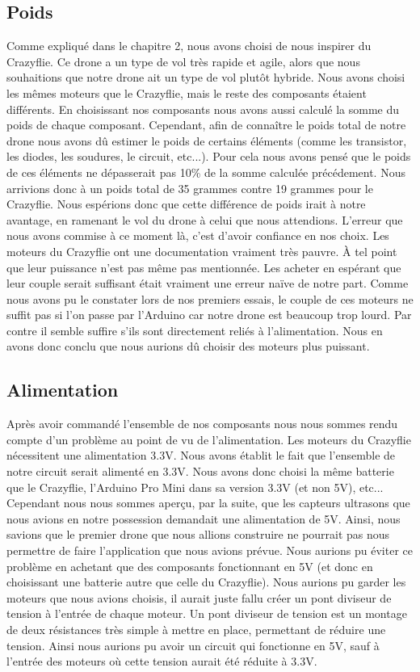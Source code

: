 \documentclass[a4paper,10pt]{report}
\begin{document}
      \subsection{Poids}
	Comme expliqué dans le chapitre 2, nous avons choisi de nous inspirer 
du Crazyflie. Ce drone a un type de vol très rapide et agile, alors que nous 
souhaitions que notre drone ait un type de vol plutôt hybride. Nous avons 
choisi les mêmes moteurs que le Crazyflie, mais le reste des composants étaient 
différents. En choisissant nos composants nous avons aussi calculé la somme du 
poids de chaque composant. Cependant, afin de connaître le poids total de 
notre drone nous avons dû estimer le poids de certains éléments (comme les 
transistor, les diodes, les soudures, le circuit, etc...). Pour cela nous avons 
pensé que le poids de ces éléments ne dépasserait pas 10\% de la somme calculée 
précédement. Nous arrivions donc à un poids total de 35 grammes contre 19 
grammes pour le Crazyflie. Nous espérions donc que cette différence de poids 
irait à notre avantage, en ramenant le vol du drone à celui que nous 
attendions.
	L'erreur que nous avons commise à ce moment là, c'est d'avoir confiance 
en nos choix. Les moteurs du Crazyflie ont une documentation vraiment très 
pauvre. À tel point que leur puissance n'est pas même pas mentionnée. Les 
acheter en espérant que leur couple serait suffisant était vraiment une erreur 
naïve de notre part.
	Comme nous avons pu le constater lors de nos premiers essais, le couple 
de ces moteurs ne suffit pas si l'on passe par l'Arduino car notre drone est 
beaucoup trop lourd. Par contre il semble suffire s'ils sont directement reliés 
à l'alimentation. Nous en avons donc conclu que nous aurions dû choisir des 
moteurs plus puissant.
      
      \subsection{Alimentation}
	Après avoir commandé l'ensemble de nos composants nous nous sommes 
rendu compte d'un problème au point de vu de l'alimentation. Les moteurs du 
Crazyflie nécessitent une alimentation 3.3V. Nous avons établit le fait que 
l'ensemble de notre circuit serait alimenté en 3.3V. Nous avons donc choisi la 
même batterie que le Crazyflie, l'Arduino Pro Mini dans sa version 3.3V (et non 
5V), etc... Cependant nous nous sommes aperçu, par la suite, que les capteurs 
ultrasons que nous avions en notre possession demandait une alimentation de 5V. 
Ainsi, nous savions que le premier drone que nous allions construire ne 
pourrait pas nous permettre de faire l'application que nous avions prévue. Nous 
aurions pu éviter ce problème en achetant que des composants fonctionnant en 5V 
(et donc en choisissant une batterie autre que celle du Crazyflie). Nous 
aurions pu garder les moteurs que nous avions choisis, il aurait juste fallu 
créer un pont diviseur de tension\cite{pontdiviseur} à l'entrée de chaque 
moteur. Un pont diviseur de tension est un montage de deux résistances très 
simple à mettre en place, permettant de réduire une tension. Ainsi nous aurions 
pu avoir un circuit qui fonctionne en 5V, sauf à l'entrée des moteurs où cette 
tension aurait été réduite à 3.3V.
\end{document}
